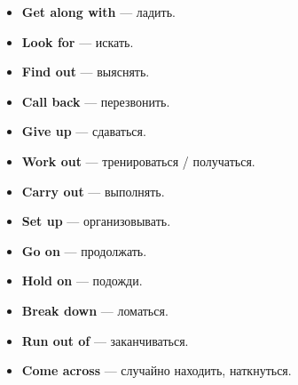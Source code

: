 \documentclass[12pt, a4paper]{article}
\begin{document}
\noindent
\begin{minipage}{0.48\textwidth}
\begin{boxpurple}[title=People and social life]
\begin{itemize}
    \item \textbf{Get along with} — ладить.
    \item \textbf{Look for} — искать.
    \item \textbf{Find out} — выяснять.
    \item \textbf{Call back} — перезвонить.
\end{itemize}
\end{boxpurple}
\end{minipage}
\hfill
\begin{minipage}{0.48\textwidth}
\begin{boxorange}[title=Work and tasks]
\begin{itemize}
    \item \textbf{Give up} — сдаваться.
    \item \textbf{Work out} — тренироваться / получаться.
    \item \textbf{Carry out} — выполнять.
    \item \textbf{Set up} — организовывать.
\end{itemize}
\end{boxorange}
\end{minipage}

\vspace{0.8em}

\begin{boxyellow}[title=Movement and change — Быстрое повторение]
\begin{itemize}
    \item \textbf{Go on} — продолжать.
    \item \textbf{Hold on} — подожди.
    \item \textbf{Break down} — ломаться.
    \item \textbf{Run out of} — заканчиваться.
    \item \textbf{Come across} — случайно находить, наткнуться.
\end{itemize}
\end{boxyellow}

\vspace{0.8em}
\end{document}
